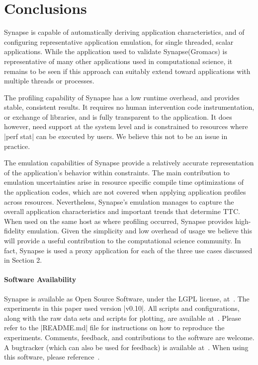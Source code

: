 \documentclass[10pt, conference, compsocconf]{IEEEtran}
\newcommand{\synapse}{Synapse\xspace}
\begin{document}
\section{Conclusions}
\label{sec:conclusions}

\synapse is capable of automatically deriving application characteristics, and
of configuring representative application emulation, for single threaded, scalar
applications.  While the application used to validate \synapse (Gromacs) is
representative of many other applications used in computational science, it
remains to be seen if this approach can suitably extend toward applications with
multiple threads or processes.


The profiling capability of \synapse has a low runtime overhead, and provides
stable, consistent results.  It requires no human intervention code
instrumentation, or exchange of libraries, and is fully transparent to the
application. It does however, need support at the system level and is
constrained to resources where |perf stat| can be executed by users. We believe
this not to be an issue in practice.

The emulation capabilities of \synapse provide a relatively accurate
representation of the application's behavior within constraints.  The main
contribution to emulation uncertainties arise in resource specific compile time
optimizations of the application codes, which are not covered when applying
application profiles across resources.  Nevertheless, \synapse's emulation
manages to capture the overall application characteristics and important trends
that determine TTC. When used on the same host as where profiling occurred,
\synapse provides high-fidelity emulation. Given the simplicity and low overhead
of usage we believe this will provide a useful contribution to the computational
science community. In fact, \synapse is used a proxy application for each of the
three use cases discussed in Section 2.




 \paragraph*{Software Availability}\label{sec:software}
 
 \synapse is available as Open Source Software, under the LGPL license,
 at~\cite{synapse_url}.  The experiments in this paper used version
 |v0.10|.  All scripts and configurations, along with the raw data
 sets and scripts for plotting, are available at~\cite{synapse_exp}.
 Please refer to the |README.md| file for instructions on how to
 reproduce the experiments.  Comments, feedback, and contributions to
 the software are welcome.  A bugtracker (which can also be used for
 feedback) is available at~\cite{synapse_tracker}.  When using this
 software, please reference~\cite{synapse}.
\end{document}
